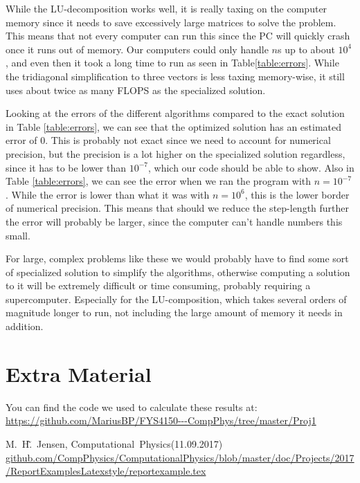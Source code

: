 \documentclass[10pt,showpacs,preprintnumbers,footinbib,amsmath,amssymb,aps,prl,twocolumn,groupedaddress,superscriptaddress,showkeys]{revtex4-1}
\begin{document}
While the LU-decomposition works well, it is really taxing on the computer memory since it needs to save excessively large matrices to solve the problem. This means that not every computer can run this since the PC will quickly crash once it runs out of memory. Our computers could only handle $n$s up to about $10^4$, and even then it took a long time to run as seen in Table\ref{table:errors}.  While the tridiagonal simplification to three vectors is less taxing memory-wise, it still uses about twice as many FLOPS as the specialized solution.

Looking at the errors of the different algorithms compared to the exact solution in Table \ref{table:errors}, we can see that the optimized solution has an estimated error of $0$. This is probably not exact since we need to account for numerical precision, but the precision is a lot higher on the specialized solution regardless, since it has to be lower than $10^{-7}$, which our code should be able to show. Also in Table \ref{table:errors}, we can see the error when we ran the program with $n = 10^{-7}$. While the error is lower than what it was with $n = 10^{6}$, this is the lower border of numerical precision. This means that should we reduce the step-length further the error will probably be larger, since the computer can't handle numbers this small. 

For large, complex problems like these we would probably have to find some sort of specialized solution to simplify the algorithms, otherwise computing a solution to it will be extremely difficult or time consuming, probably requiring a supercomputer. Especially for the LU-composition, which takes several orders of magnitude longer to run, not including the large amount of memory it needs in addition. 

\section{Extra Material}
You can find the code we used to calculate these results at: \url{https://github.com/MariusBP/FYS4150---CompPhys/tree/master/Proj1}

\begin{thebibliography}{99}
 M.~H.̃~Jensen, Computational~Physics(11.09.2017) \url{github.com/CompPhysics/ComputationalPhysics/blob/master/doc/Projects/2017/ReportExamplesLatexstyle/reportexample.tex}
\end{thebibliography}
\end{document}
